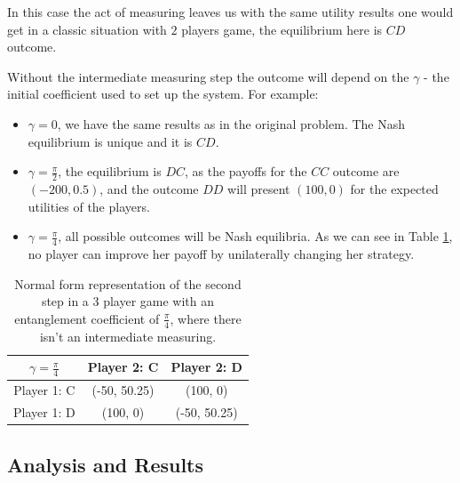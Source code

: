 In this case the act of measuring leaves us with the same utility results one would get in a classic situation with $2$ players game, the equilibrium here is $CD$ outcome. 

Without the intermediate measuring step the outcome will depend on the $\gamma$ - the initial coefficient used to set up the system. For example:

\begin{itemize}
\item $\gamma = 0$, we have the same results as in the original problem. The Nash equilibrium is unique and it is $CD$.
\item $\gamma = \frac{\pi}{2}$, the equilibrium is $DC$, as the payoffs for the $CC$ outcome are $(-200, 0.5)$, and the outcome $DD$ will present $(100, 0)$ for the expected utilities of the players.
\item $\gamma = \frac{\pi}{4}$, all possible outcomes will be Nash equilibria. As we can see in Table \ref{tab:hate_myself}, no player can improve her payoff by unilaterally changing her strategy.



\end{itemize}

\begin{center}
\begin{table}
\begin{centering}
\begin{tabular}{ccc}
\hline 
 $\gamma = \frac{\pi}{4}$ & Player 2: C & Player 2: D\tabularnewline
\hline 
Player 1: C & (-50, 50.25) & (100, 0)\tabularnewline
Player 1: D & (100, 0) & (-50, 50.25)\tabularnewline
\hline 
\end{tabular}
\par\end{centering}

\caption{Normal form representation of the second step in a 3 player game with an entanglement coefficient of $\frac{\pi}{4}$, where there isn't an intermediate measuring. }
\label{tab:hate_myself}
\end{table}
\end{center}


\subsection{Analysis and Results}
\label{subsec:description_3}


